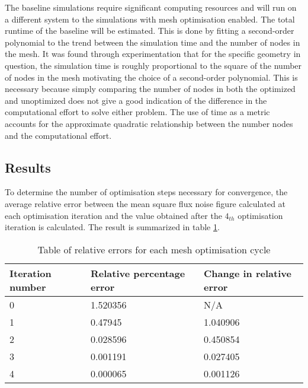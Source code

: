 The baseline simulations require significant computing resources and will run on a different system to the simulations with mesh optimisation enabled.
The total runtime of the baseline will be estimated. This is done by fitting a second-order polynomial to the trend between the simulation time and the number of nodes in the mesh. It was found through experimentation that for the specific geometry in question, the simulation time is roughly proportional to the square of the number of nodes in the mesh motivating the choice of a second-order polynomial. This is necessary because simply comparing the number of nodes in both the optimized and unoptimized does not give a good indication of the difference in the computational effort to solve either problem. The use of time as a metric accounts for the approximate quadratic relationship between the number nodes and the computational effort.

\subsection{Results}

To determine the number of optimisation steps necessary for convergence, the average relative error between the mean square flux noise figure calculated at each optimisation iteration and the value obtained after the $4_{th}$ optimisation iteration is calculated. The result is summarized in table \ref{tab:relerr}.


\begin{table}[H]
    \centering
    \begin{tabular}{lll}
    \hline
    Iteration number & Relative percentage error & Change in relative error \\ \hline
    0                & 1.520356                  & N/A                      \\
    1                & 0.47945                   & 1.040906                 \\
    2                & 0.028596                  & 0.450854                 \\
    3                & 0.001191                  & 0.027405                 \\
    4                & 0.000065                  & 0.001126                 \\ \hline         
    \end{tabular}
    \caption{Table of relative errors for each mesh optimisation cycle}
    \label{tab:relerr}
\end{table}

